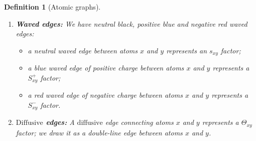 \documentclass{article}
\newcommand{\1}{\mathds{1}}
\numberwithin{equation}{section}
\newcommand{\dashed}{\text{diffusive}}
\newcommand{\Dashed}{\text{Diffusive}}
\theoremstyle{plain} %
\newtheorem{definition}[theorem]{Definition}
\theoremstyle{remark}
\newcommand{\cor}{\color{red}}
\newcommand{\nc}{\normalcolor}
\newcommand{\Sele}{{\mathcal E}}
\newcommand{\Cele}{{\mathscr E}}
\begin{document}
\begin{definition}[Atomic graphs]
\begin{itemize}
\begin{enumerate}
\item {\bf Waved edges:} We have neutral black, positive blue and negative red waved edges:  
\begin{itemize}
\item a neutral waved edge between atoms $x$ and $y$ represents an $s_{xy}$ factor; 

\item a blue waved edge of positive charge between atoms $x$ and $y$ represents a $S^+_{xy}$ factor;

\item a red waved edge of negative charge between atoms $x$ and $y$ represents a $S^-_{xy}$ factor.
\end{itemize}




\item {\bf $\Dashed$ edges:} 
A $\dashed$ edge connecting atoms $x$ and $y$ represents a ${\Theta}_{xy}$ factor;
 we draw it as a double-line edge between atoms $x$ and $y$. 



\end{enumerate}
\end{itemize}
\end{definition}
\end{document}
